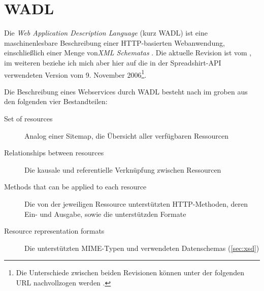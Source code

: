 \section{WADL}

Die \emph{Web Application Description Language} (kurz \gls{WADL}) ist eine maschinenlesbare Beschreibung einer HTTP-basierten Webanwendung, einschließlich einer Menge von\emph{XML Schematas} \cite{hadleyWADL}.
Die aktuelle Revision ist vom , im weiteren beziehe ich mich aber hier auf die in der Spreadshirt-API verwendeten Version vom 9. November 2006\footnote{Die Unterschiede zwischen beiden Revisionen können unter der folgenden URL nachvollzogen werden .}.

Die Beschreibung eines Webservices durch WADL besteht nach \cite{hadleyWADL} im groben aus den folgenden vier Bestandteilen:
\begin{description}
     \item[Set of resources] Analog einer Sitemap, die Übersicht aller verfügbaren Ressourcen
     \item[Relationships between resources] Die kausale und referentielle Verknüpfung zwischen Ressourcen
     \item[Methods that can be applied to each resource] Die von der jeweiligen Ressource unterstützten HTTP-Methoden, deren Ein- und Ausgabe, sowie die unterstützden Formate
     \item[Resource representation formats] Die unterstützten \gls{MIME}-Typen und verwendeten Datenschemas (\cref{sec:xsd})
 \end{description} 

